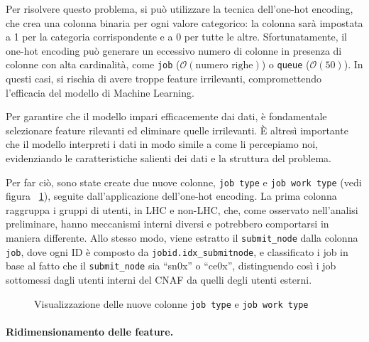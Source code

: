 Per risolvere questo problema, si può utilizzare la tecnica dell'one-hot
encoding, che crea una colonna binaria per ogni valore categorico: la colonna
sarà impostata a 1 per la categoria corrispondente e a 0 per tutte le altre.
Sfortunatamente, il one-hot encoding può generare un eccessivo numero di
colonne in presenza di colonne con alta cardinalità, come \texttt{job}
($\mathcal{O}(\text{numero righe})$) o \texttt{queue} ($\mathcal{O}(50)$). In
questi casi, si rischia di avere troppe feature irrilevanti, compromettendo
l'efficacia del modello di Machine Learning. 

Per garantire che il modello impari efficacemente dai dati, è fondamentale
selezionare feature rilevanti ed eliminare quelle irrilevanti. È altresì
importante che il modello interpreti i dati in modo simile a come li
percepiamo noi, evidenziando le caratteristiche salienti dei dati e la
struttura del problema. 

Per far ciò, sono state create due nuove colonne, \texttt{job type} e
\texttt{job work type} (vedi figura ~\ref{fig:job_type_and_job_work_type}),
seguite dall'applicazione dell'one-hot encoding. La prima colonna raggruppa i
gruppi di utenti, in LHC e non-LHC, che, come osservato nell'analisi
preliminare, hanno meccanismi interni diversi e potrebbero comportarsi in
maniera differente. Allo stesso modo, viene estratto il \verb|submit_node|
dalla colonna \texttt{job}, dove ogni ID è composto da
\verb|jobid.idx_submitnode|, e classificato i job in base al fatto che il
\verb|submit_node| sia ``sn0x'' o ``ce0x'', distinguendo così i job sottomessi
dagli utenti interni del CNAF da quelli degli utenti esterni.

\begin{figure}[!ht]
    \centering
    \hspace{2cm}
    \caption{Visualizzazione delle nuove colonne \texttt{job type} e \texttt{job work type}}
    \label{fig:job_type_and_job_work_type}
\end{figure}

\paragraph{Ridimensionamento delle feature.}


